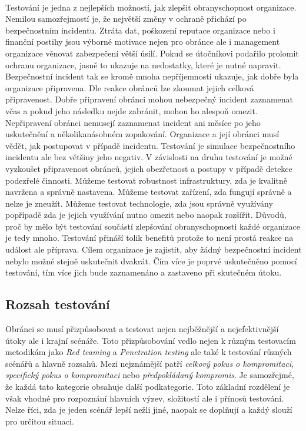 \paragraph{}
Testování je jedna z nejlepších možností, jak zlepšit obranyschopnost organizace.
Nemilou samozřejmostí je, že největší změny v ochraně přichází po bezpečnostním incidentu.
Ztráta dat, poškození reputace organizace nebo i finanční postihy jsou výborné motivace nejen pro obránce ale i management organizace věnovat zabezpečení větší úsilí.
Pokud se útočníkovi podařilo prolomit ochranu organizace, jasně to ukazuje na nedostatky, které je nutné napravit.
Bezpečnostní incident tak se kromě mnoha nepříjemností ukazuje, jak dobře byla organizace připravena.
Dle reakce obránců lze zkoumat jejich celková připravenost.
Dobře připravení obránci mohou nebezpečný incident zaznamenat včas a pokud jeho následku nejde zabránit, mohou ho alespoň omezit.
Nepřipravení obránci nemusejí zaznamenat incident ani měsíce po jeho uskutečnění a několikanásobném zopakování.
Organizace a její obránci musí vědět, jak postupovat v případě incidentu.
Testování je simulace bezpečnostního incidentu ale bez většiny jeho negativ.
V závislosti na druhu testování je možné vyzkoušet připravenost obránců, jejich obezřetnost a postupy v případě detekce podezřelé činnosti.
Můžeme testovat robustnost infrastruktury, zda je kvalitně navržena a správně nastavena.
Můžeme testovat zařízení, zda fungují správně a nelze je zneužít.
Můžeme testovat technologie, zda jsou správně využívány popřípadě zda je jejich využívání nutno omezit nebo naopak rozšířit.
Důvodů, proč by mělo být testování součástí zlepšování obranyschopnosti každé organizace je tedy mnoho.
Testování přináší tolik benefitů protože to není prostá reakce na událost ale příprava.
Cílem organizace je zajistit, aby žádný bezpečnostní incident nebylo možné stejně uskutečnit dvakrát.
Čím více je poprvé uskutečněno pomocí testování, tím více jich bude zaznamenáno a zastaveno při skutečném útoku.


\subsection{Rozsah testování}\label{subsec:rozsah-testovni}
Obránci se musí přizpůsobovat a testovat nejen nejběžnější a nejefektivnější útoky ale i krajní scénáře.
Toto přizpůsobování vedlo nejen k různým testovacím metodikám jako \textit{Red teaming} a \textit{Penetration testing} ale také k testování různých scénářů a hlavně rozsahů.
Mezi nejznámější patří \textit{celkový pokus o kompromitaci}, \textit{specifický pokus o kompromitaci} nebo \textit{předpokládaný kompromis}.
Je samozřejmé, že každá tato kategorie obsahuje další podkategorie.
Toto základní rozdělení je však vhodné pro rozpoznání hlavních výzev, složitostí ale i přínosů testování.
Nelze říci, zda je jeden scénář lepší nežli jiné, naopak se doplňují a každý slouží pro určitou situaci.\cite{red_team_oakley_2019}


